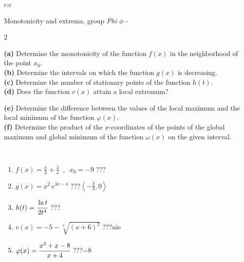 \documentclass[10pt]{report}
\begin{document}
\begin{tabular}{c:c}
\begin{minipage}[c][104.5mm][t]{0.5\linewidth}
\begin{center}
\vspace{5mm}
{\huge Monotonicity and extrema, group \textit{Phi $\phi$} -}\\[5mm]
\begin{minipage}{0.95\linewidth}
\begin{center}
{\small \begin{multicols}{2} \raggedright
\textbf{(a)} Determine the monotonicity of the function \(f(x)\) in the neighborhood of the point \(x_0\). \\[1mm]
\textbf{(b)} Determine the intervals on which the function \(g(x)\) is decreasing. \\[1mm]
\textbf{(c)} Determine the number of stationary points of the function \(h(t)\). \\[1mm]
\textbf{(d)} Does the function \(v(x)\) attain a local extremum? \par \columnbreak
\textbf{(e)} Determine the difference between the values of the local maximum and the local minimum of the function \(\varphi(x)\). \\[1mm]
\textbf{(f)} Determine the product of the \(x\)-coordinates of the points of the global maximum and global minimum of the function \(\omega(x)\) on the given interval. \\[1mm]
\end{multicols}
}
\end{center}
\end{minipage}
\\[1mm]
\begin{minipage}{0.79\linewidth}
\begin{center}
\begin{varwidth}{\linewidth}
\setlength{\itemsep}{0pt}
\begin{enumerate}
\normalsize
\item $f(x)=\frac{x}{3}+\frac{3}{x} \enspace , \enspace x_0=-9$\quad \dotfill\; ???\;\dotfill \quad {}
\item $g(x)=x^2\, e^{3x-4}$\quad \dotfill\; ???\;\dotfill \quad $\left\langle-\frac{2}{3} , 0\right\rangle$
\item $h(t)=\cfrac{\ln t}{2t^4}$\quad \dotfill\; ???\;\dotfill {}
\item $v(x)=-5-\sqrt[7]{(x+6)^2}$\quad \dotfill\; ???\;\dotfill \quad $\text{nie}$
\item $\varphi(x)=\cfrac{x^2+x-8}{x+4}$\quad \dotfill\; ???\;\dotfill \quad $-8$

\end{enumerate}
\end{varwidth}
\end{center}
\end{minipage}
\end{center}
\end{minipage}
\end{tabular}
\end{document}
